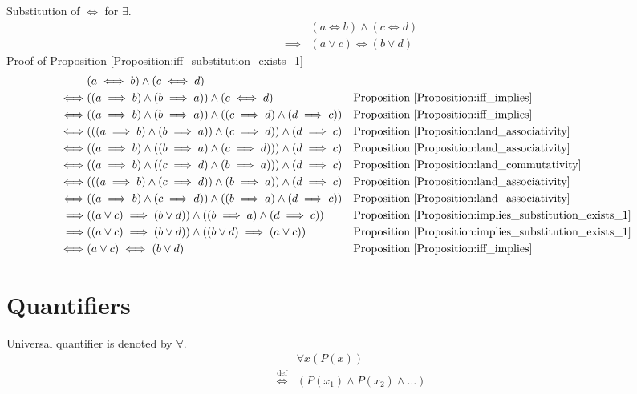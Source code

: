 \begin{prop}
\label{Proposition:iff_substitution_exists_1}
Substitution of $\iff$ for $\exists$.
\begin{align*}
& (a \iff b) \land (c \iff d) \\
\implies & (a \lor c) \iff (b \lor d)
\end{align*}
Proof of Proposition \ref{Proposition:iff_substitution_exists_1}
\begin{align*}
& (a \iff b) \land (c \iff d) \\
\iff & ((a \implies b) \land (b \implies a)) \land (c \iff d)
& & \text{Proposition \ref{Proposition:iff_implies}} \\
\iff & ((a \implies b) \land (b \implies a)) \land ((c \implies d) \land (d \implies c))
& & \text{Proposition \ref{Proposition:iff_implies}} \\
\iff & (((a \implies b) \land (b \implies a)) \land (c \implies d)) \land (d \implies c)
& & \text{Proposition \ref{Proposition:land_associativity}} \\
\iff & ((a \implies b) \land ((b \implies a) \land (c \implies d))) \land (d \implies c)
& & \text{Proposition \ref{Proposition:land_associativity}} \\
\iff & ((a \implies b) \land ((c \implies d) \land (b \implies a))) \land (d \implies c)
& & \text{Proposition \ref{Proposition:land_commutativity}} \\
\iff & (((a \implies b) \land (c \implies d)) \land (b \implies a)) \land (d \implies c)
& & \text{Proposition \ref{Proposition:land_associativity}} \\
\iff & ((a \implies b) \land (c \implies d)) \land ((b \implies a) \land (d \implies c))
& & \text{Proposition \ref{Proposition:land_associativity}} \\
\implies & ((a \lor c) \implies (b \lor d)) \land ((b \implies a) \land (d \implies c))
& & \text{Proposition \ref{Proposition:implies_substitution_exists_1}} \\
\implies & ((a \lor c) \implies (b \lor d)) \land ((b \lor d) \implies (a \lor c))
& & \text{Proposition \ref{Proposition:implies_substitution_exists_1}} \\
\iff & (a \lor c) \iff (b \lor d)
& & \text{Proposition \ref{Proposition:iff_implies}} \\
\end{align*}
\end{prop}

\section{Quantifiers}
\begin{defn}
Universal quantifier is denoted by $\forall$.
\begin{align*}
& \forall x (P(x)) \\
\overset{\operatorname{def}}{\iff} & (P(x_1) \land P(x_2) \land \dots)
\end{align*}
\end{defn}

